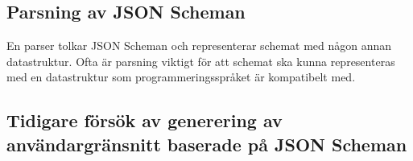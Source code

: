 \subsection{Parsning av JSON Scheman}
\label{sec:teori:schema-användningsområden:parsning}
En parser tolkar JSON Scheman och representerar schemat med någon annan datastruktur. Ofta är parsning viktigt för att schemat ska kunna representeras med en datastruktur som programmeringsspråket är kompatibelt med.

\subsection{Tidigare försök av generering av användargränsnitt baserade på JSON Scheman}
\label{sec:teori:schema-användningsområden:ui-generering}

%
%


%
%
%	




